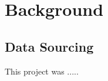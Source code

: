 \documentclass[12pt]{article} %
\begin{document}
	\section{Background}
	
	\subsection {Data Sourcing}
	
	This project was .....
	


	
	
	
	
	
	
	
	
	
	
	
	
	
\end{document}
